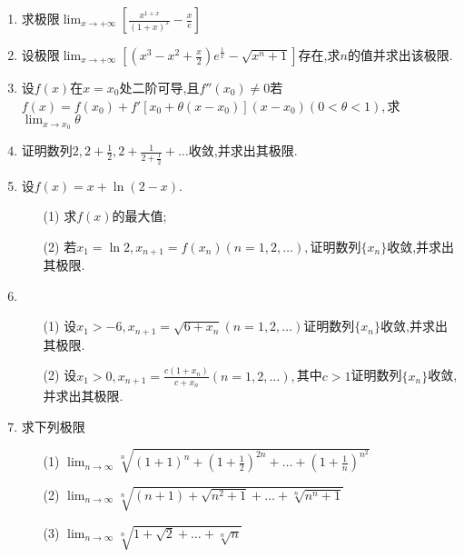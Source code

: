 \documentclass[12pt, a4paper, oneside, UTF8]{ctexbook}
\begin{document}
\begin{enumerate}
    \newpage
    
    \item 求极限$\lim_{x\to +\infty}\left[\frac{x^{1+x}}{(1+x)^x}-\frac{x}{e}\right]$
    
    \newpage
    
    \item 设极限$\lim_{x\to +\infty}\left[\left(x^3-x^2+\frac{x}{2}\right)e^{\frac{1}{x}}-\sqrt{x^n+1}\right]$存在,求$n$的值并求出该极限.
    
    \newpage
        
    \item 设$f(x)$在$x=x_0$处二阶可导,且$f''(x_0)\neq 0$若$f(x)=f(x_0)+f'\left[x_0+\theta(x-x_0)\right](x-x_0)(0<\theta<1),$求$\lim_{x\to x_0}\theta$
    
    \newpage
    
    \item 证明数列$2,2+\frac{1}{2},2+\frac{1}{2+\frac{1}{2}}+\ldots$收敛,并求出其极限.
    
    \newpage
    
    \item 设$f(x)=x+\ln{(2-x)}.$
    \begin{enumerate}
        \item [(1)] 求$f(x)$的最大值;
        \item [(2)] 若$x_1=\ln{2},x_{n+1}=f(x_n)(n=1,2,\ldots),$证明数列$\{x_n\}$收敛,并求出其极限.
    \end{enumerate}
    
    \newpage
    
    \item 
    \begin{enumerate}
        \item [(1)] 设$x_1>-6,x_{n+1}=\sqrt{6+x_n}(n=1,2,\ldots)$证明数列$\{x_n\}$收敛,并求出其极限.
        \item [(2)] 设$x_1>0,x_{n+1}=\frac{c(1+x_n)}{c+x_n}(n=1,2,\ldots),$其中$c>1$证明数列$\{x_n\}$收敛,并求出其极限.
    \end{enumerate}
    
    \newpage
    
    \item 求下列极限
    \begin{enumerate}
        \item [(1)] $\lim_{n\to\infty}\sqrt[n]{(1+1)^n+(1+\frac{1}{2})^{2n}+\ldots+(1+\frac{1}{n})^{n^2}}$
        \item [(2)] $\lim_{n\to\infty}\sqrt[n]{(n+1)+\sqrt{n^2+1}+\ldots+\sqrt[n]{n^n+1}}$
        \item [(3)] $\lim_{n\to\infty}\sqrt[n]{1+\sqrt{2}+\ldots+\sqrt[n]{n}}$
    \end{enumerate}
    

\end{enumerate}
\end{document}
